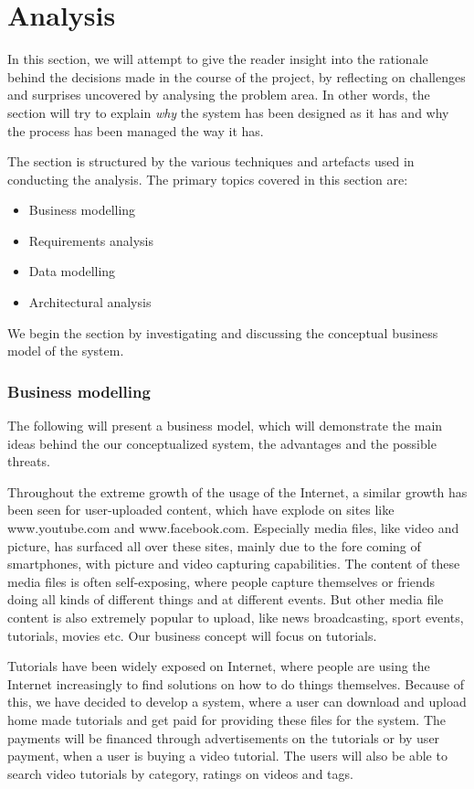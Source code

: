 \part{Analysis}
In this section, we will attempt to give the reader insight into the rationale behind the decisions made in the course of the project, by reflecting on challenges and surprises uncovered by analysing the problem area. In other words, the section will try to explain \textit{why} the system has been designed as it has and why the process has been managed the way it has.

The section is structured by the various techniques and artefacts used in conducting the analysis. The primary topics covered in this section are:
\begin{itemize}
\item Business modelling
\item Requirements analysis
\item Data modelling
\item Architectural analysis
\end{itemize}
We begin the section by investigating and discussing the conceptual business model of the system.

\section{Business modelling}
The following will present a business model, which will demonstrate the main ideas behind the our conceptualized system, the advantages and the possible threats.

Throughout the extreme growth of the usage of the Internet, a similar growth has been seen for user-uploaded content, which have explode on sites like www.youtube.com and www.facebook.com. Especially media files, like video and picture, has surfaced all over these sites, mainly due to the fore coming of smartphones, with picture and video capturing capabilities. The content of these media files is often self-exposing, where people capture themselves or friends doing all kinds of different things and at different events. But other media file content is also extremely popular to upload, like news broadcasting, sport events, tutorials, movies etc. Our business concept will focus on tutorials.

Tutorials have been widely exposed on Internet, where people are using the Internet increasingly to find solutions on how to do things themselves. Because of this, we have decided to develop a system, where a user can download and upload home made tutorials and get paid for providing these files for the system. The payments will be financed through advertisements on the tutorials or by user payment, when a user is buying a video tutorial. The users will also be able to search video tutorials by category, ratings on videos and tags.

